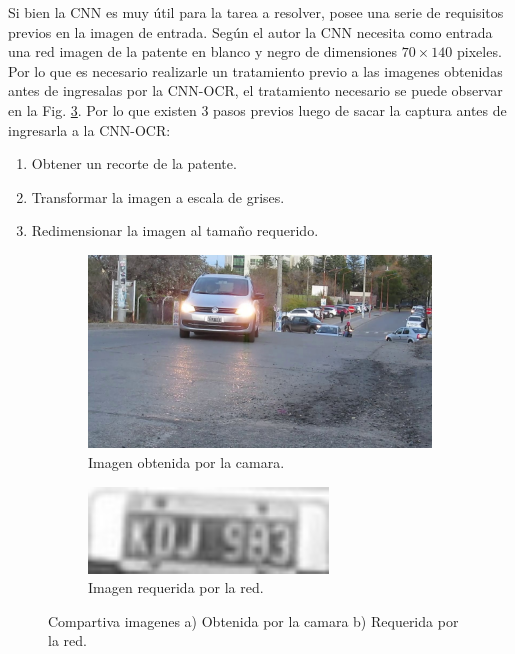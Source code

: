 Si bien la CNN es muy útil para la tarea a resolver, posee una serie de requisitos previos en la imagen de entrada.
Según el autor la CNN necesita como entrada una red imagen de la patente en blanco y negro de dimensiones $70 \times 140$ pixeles.
Por lo que es necesario realizarle un tratamiento previo a las imagenes obtenidas antes de ingresalas por la CNN-OCR, el tratamiento necesario se puede observar en la Fig. \ref{fig:Comparativa-imagenes}. Por lo que existen 3 pasos previos luego de sacar la captura antes de ingresarla a la CNN-OCR:

\begin{enumerate}
    \item Obtener un recorte de la patente.
    \item Transformar la imagen a escala de grises.
    \item Redimensionar la imagen al tamaño requerido.
\end{enumerate}
\begin{figure}[!tbp]
    \centering
    \begin{subfigure}[b]{0.49\textwidth}
        \centering
        \includegraphics[width=\textwidth]{imgs/imagen-obtenida.jpg}
        \caption{Imagen obtenida por la camara.}
        \label{fig:imagen-obtenida}
    \end{subfigure}
    \hfill
    \begin{subfigure}[b]{0.49\textwidth}
        \centering
        \includegraphics[width=0.7\textwidth]{imgs/imagen-requerida.jpg}
        \caption{Imagen requerida por la red.}
        \label{fig:imagen-requerida}
    \end{subfigure}
    \caption{Compartiva imagenes a) Obtenida por la camara b) Requerida por la red.}
    \label{fig:Comparativa-imagenes}
\end{figure}

